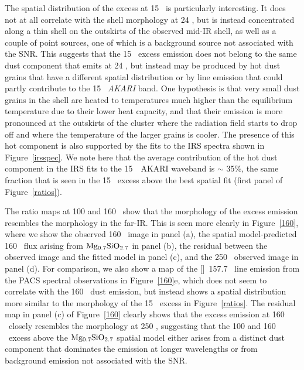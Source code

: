 \documentclass{emulateapj}
\begin{document}
The spatial distribution of the excess at 15 \micron\ is particularly interesting. It does not at all correlate with the shell morphology at 24 \micron, but is instead concentrated along a thin shell on the outskirts of the observed mid-IR shell, as well as a couple of point sources, one of which is a background source not associated with the SNR. This suggests that the 15 \micron\ excess emission does not belong to the same dust component that emits at 24 \micron, but instead may be produced by hot dust grains that have a different spatial distribution or by line emission that could partly contribute to the 15 \micron\ \textit{AKARI} band. One hypothesis is that very small dust grains in the shell are heated to temperatures much higher than the equilibrium temperature due to their lower heat capacity, and that their emission is more pronounced at the outskirts of the cluster where the radiation field starts to drop off and where the temperature of the larger grains is cooler. The presence of this hot component is also supported by the fits to the IRS spectra shown in Figure~\ref{irsspec}. We note here that the average contribution of the hot dust component in the IRS fits to the 15~\micron\ AKARI waveband is $\sim$ 35\%, the same fraction that is seen in the 15 \micron\ excess above the best spatial fit (first panel of Figure~\ref{ratios}).



The ratio maps at 100 and 160 \micron\ show that the morphology of the excess emission resembles the morphology in the far-IR. This is seen more clearly in Figure~\ref{160}, where we show the observed 160 \micron\ image in panel (a), the spatial model-predicted 160 \micron\ flux arising from $\rm Mg_{0.7}SiO_{2.7}$ in panel (b), the residual between the observed image and the fitted model in panel (c), and the 250 \micron\ observed image in panel (d). For comparison, we also show a map of the []~157.7 \micron\ line emission from the PACS spectral observations in Figure~\ref{160}e, which does not seem to correlate with the 160 \micron\ dust emission, but instead shows a spatial distribution more similar to the morphology of the 15 \micron\ excess in Figure~\ref{ratios}. 
The residual map in panel (c) of Figure~\ref{160} clearly shows that the excess emission at 160 \micron\ closely resembles the morphology at 250 \micron, suggesting that the 100 and 160 \micron\ excess above the $\rm Mg_{0.7}SiO_{2.7}$ spatial model either arises from a distinct dust component that dominates the emission at longer wavelengths or from background emission not associated with the SNR. 
\end{document}

